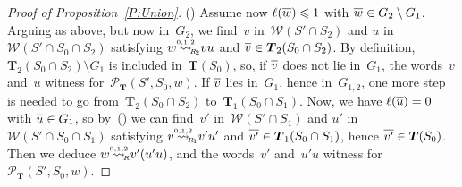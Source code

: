 \documentclass{amsart}
\numberwithin{equation}{section}
\theoremstyle{plain}
\theoremstyle{definition}
\newcounter{ITEM}
\let\le=\leqslant
\begin{document}
\begin{proof}[Proof of Proposition~\ref{P:Union}]
{\setcounter{ITEM}{2}\leavevmode\hbox{\rm()}} Assume now ${\ell({{\overline{\vrule width0pt height5pt{w}}}})} \le 1$ with ${\overline{\vrule width0pt height5pt{w}}} \in {G}_2 \setminus {G}_1$. Arguing as above, but now in~${G}_2$, we find~${v}$ in~${\mathcal{W}({{S}' \cap {S}_2})}$ and ${u}$ in~${\mathcal{W}({{S}' \cap {S}_0 \cap {S}_2})}$ satisfying ${w} {\mathrel{{\mathrel{\overset{\scriptscriptstyle 0,1,2}{\rightsquigarrow}}}_{\hspace{-0.9ex}{\scriptscriptstyle R}_{\hspace{-0.2ex}2}}}} {v} {u}$ and ${\overline{\vrule width0pt height5pt{v}}} \in {\boldsymbol{T}}_2({S}_0 \cap {S}_2)$. By definition, ${\boldsymbol{T}}_2({S}_0 \cap {S}_2) \setminus {G}_1$ is included in~${\boldsymbol{T}}({S}_0)$, so, if ${\overline{\vrule width0pt height5pt{v}}}$ does not lie in~${G}_1$, the words~${v}$ and~${u}$ witness for~${\mathcal{P}}_{\boldsymbol{T}}({S}', {S}_0, {w})$. If ${\overline{\vrule width0pt height5pt{v}}}$ lies in~${G}_1$, hence in~${G}_{1,2}$, one more step is needed to go from~${\boldsymbol{T}}_2({S}_0 \cap {S}_2)$ to~${\boldsymbol{T}}_1({S}_0 \cap {S}_1)$. Now, we have ${\ell({{\overline{\vrule width0pt height5pt{u}}}})} = 0$ with ${\overline{\vrule width0pt height5pt{u}}} \in {G}_1$, so by~{\setcounter{ITEM}{1}\leavevmode\hbox{\rm()}} we can find~${v}'$ in~${\mathcal{W}({{S}' \cap {S}_1})}$ and ${u}'$ in~${\mathcal{W}({{S}' \cap {S}_0 \cap {S}_1})}$ satisfying ${v} {\mathrel{{\mathrel{\overset{\scriptscriptstyle 0,1,2}{\rightsquigarrow}}}_{\hspace{-0.9ex}{\scriptscriptstyle R}_{\hspace{-0.2ex}1}}}} {v}' {u}'$ and ${\overline{\vrule width0pt height5pt{{v}'}}} \in {\boldsymbol{T}}_1({S}_0 \cap {S}_1)$, hence ${\overline{\vrule width0pt height5pt{{v}'}}} \in {\boldsymbol{T}}({S}_0)$. Then we deduce ${w} {\mathrel{{\mathrel{\overset{\scriptscriptstyle 0,1,2}{\rightsquigarrow}}}_{\hspace{-0.9ex}{\scriptscriptstyle R}}}} {v}' ({u}' {u})$, and the words~${v}'$ and~${u}' {u}$ witness for~${\mathcal{P}}_{\boldsymbol{T}}({S}', {S}_0, {w})$.


\end{proof}
\end{document}
